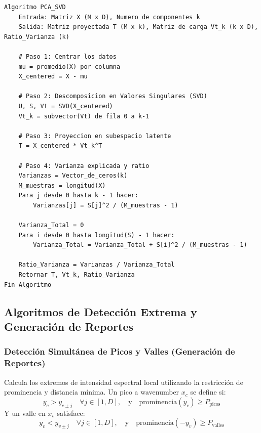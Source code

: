 \begin{lstlisting}[caption=Algoritmo de Analisis de Componentes Principales mediante SVD]
Algoritmo PCA_SVD
    Entrada: Matriz X (M x D), Numero de componentes k
    Salida: Matriz proyectada T (M x k), Matriz de carga Vt_k (k x D), Ratio_Varianza (k)

    # Paso 1: Centrar los datos
    mu = promedio(X) por columna
    X_centered = X - mu

    # Paso 2: Descomposicion en Valores Singulares (SVD)
    U, S, Vt = SVD(X_centered)
    Vt_k = subvector(Vt) de fila 0 a k-1

    # Paso 3: Proyeccion en subespacio latente
    T = X_centered * Vt_k^T

    # Paso 4: Varianza explicada y ratio
    Varianzas = Vector_de_ceros(k)
    M_muestras = longitud(X)
    Para j desde 0 hasta k - 1 hacer:
        Varianzas[j] = S[j]^2 / (M_muestras - 1)

    Varianza_Total = 0
    Para i desde 0 hasta longitud(S) - 1 hacer:
        Varianza_Total = Varianza_Total + S[i]^2 / (M_muestras - 1)

    Ratio_Varianza = Varianzas / Varianza_Total
    Retornar T, Vt_k, Ratio_Varianza
Fin Algoritmo
\end{lstlisting}

\subsection{Algoritmos de Detección Extrema y Generación de Reportes}

\subsubsection{Detección Simultánea de Picos y Valles (Generación de Reportes)}
Calcula los extremos de intensidad espectral local utilizando la restricción de prominencia y distancia mínima. Un pico a wavenumber $x_c$ se define si:
\begin{equation}
    y_c > y_{c \pm j} \quad \forall j \in [1, D], \quad \text{y} \quad \text{prominencia}(y_c) \ge P_{\text{picos}}
\end{equation}
Y un valle en $x_v$ satisface:
\begin{equation}
    y_v < y_{v \pm j} \quad \forall j \in [1, D], \quad \text{y} \quad \text{prominencia}(-y_v) \ge P_{\text{valles}}
\end{equation}


